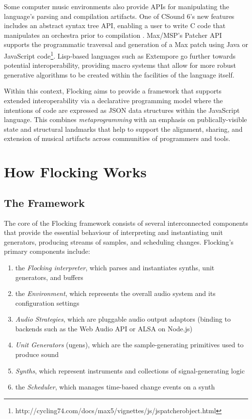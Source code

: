 \documentclass{article}
\begin{document}
Some computer music environments also provide APIs for manipulating the language's parsing and compilation artifacts. One of CSound 6's new features includes an abstract syntax tree API, enabling a user to write C code that manipulates an orchestra prior to compilation \cite{fitch2013Csound6}. Max/MSP's Patcher API supports the programmatic traversal and generation of a Max patch using Java or JavaScript code\footnote{http://cycling74.com/docs/max5/vignettes/js/jspatcherobject.html}. Lisp-based languages such as Extempore go further towards potential interoperability, providing macro systems that allow for more robust generative algorithms to be created within the facilities of the language itself.

Within this context, Flocking aims to provide a framework that supports extended interoperability via a declarative programming model where the intentions of code are expressed as JSON data structures within the JavaScript language. This combines {\it metaprogramming} with an emphasis on publically-visible state and structural landmarks that help to support the alignment, sharing, and extension of musical artifacts across communities of programmers and tools.

\section{How Flocking Works}

\subsection{The Framework}

The core of the Flocking framework consists of several interconnected components that provide the essential behaviour of interpreting and instantiating unit generators, producing streams of samples, and scheduling changes. Flocking's primary components include:

\begin{enumerate}
\item the {\it Flocking interpreter}, which parses and instantiates synths, unit generators, and buffers
\item the {\it Environment}, which represents the overall audio system and its configuration settings
\item {\it Audio Strategies}, which are pluggable audio output adaptors (binding to backends such as the Web Audio API or ALSA on Node.js)
\item {\it Unit Generators} (ugens), which are the sample-generating primitives used to produce sound
\item {\it Synths}, which represent instruments and collections of signal-generating logic
\item the {\it Scheduler}, which manages time-based change events on a synth
\end{enumerate}
\end{document}
